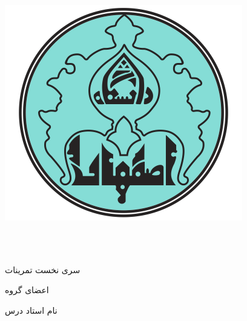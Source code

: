 \documentclass[11pt]{article}
\begin{document}


\begin{center}

    \includegraphics[scale=0.2]{./UILogo.png}

    \University \\
    \Department\\
    
    
    \begin{large}
    \vspace{0.5cm}
    
    \end{large}
    
    \vspace{1cm}
    \begin{latin}
        {\Large\textbf\EnglishCourseTitle}
    \end{latin}
    \begin{center}
        \CourseName
    \end{center}
    
    \vspace{1cm}
    {\large{سری نخست تمرینات}}\\
    \vspace{0.25cm}
    {\large\textbf{\courseSemester}}

    \vspace{1.25cm}

    {اعضای گروه}\\
    \begin{spacing}{1.5}
        {{\GroupeMembers}}
    \end{spacing}
    
    \vspace{1.25cm}
    

    \vspace{0.5cm}
    {نام استاد درس}\\[0.5em]
    {\large\textbf{\CourseProfessor}}
    
    \vspace{1.2cm}

\end{center}
\pagebreak
\end{document}
